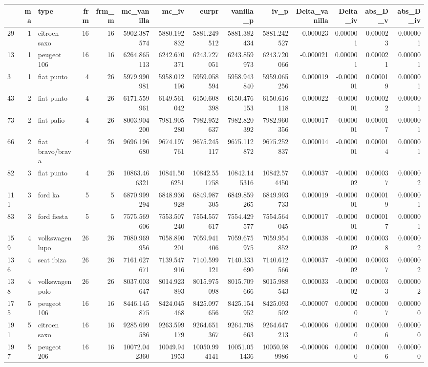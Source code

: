 \begin{tabular}{lrlrrrrrrrrrrr}
\toprule
 & ma & type & frm & frm_m & mc_vanilla & mc_iv & eurpr & vanilla_p & iv_p & Delta_vanilla & Delta_iv & abs_D_v & abs_D_iv \\
\midrule
29 & 1 & citroen saxo & 16 & 16 & 5902.387574 & 5880.192832 & 5881.249512 & 5881.382434 & 5881.242527 & -0.000023 & 0.000001 & 0.000023 & 0.000001 \\
13 & 1 & peugeot 106 & 16 & 16 & 6264.865113 & 6242.670371 & 6243.727051 & 6243.859973 & 6243.720066 & -0.000021 & 0.000001 & 0.000021 & 0.000001 \\
3 & 1 & fiat punto & 4 & 26 & 5979.990981 & 5958.012196 & 5959.058594 & 5958.943840 & 5959.065256 & 0.000019 & -0.000001 & 0.000019 & 0.000001 \\
43 & 2 & fiat punto & 4 & 26 & 6171.559961 & 6149.561042 & 6150.608398 & 6150.476153 & 6150.616118 & 0.000022 & -0.000001 & 0.000022 & 0.000001 \\
73 & 2 & fiat palio & 4 & 26 & 8003.904200 & 7981.905280 & 7982.952637 & 7982.820392 & 7982.960356 & 0.000017 & -0.000001 & 0.000017 & 0.000001 \\
66 & 2 & fiat bravo/brava & 4 & 26 & 9696.196680 & 9674.197761 & 9675.245117 & 9675.112872 & 9675.252837 & 0.000014 & -0.000001 & 0.000014 & 0.000001 \\
82 & 3 & fiat punto & 4 & 26 & 10863.466321 & 10841.506251 & 10842.551758 & 10842.145316 & 10842.574450 & 0.000037 & -0.000002 & 0.000037 & 0.000002 \\
111 & 3 & ford ka & 5 & 5 & 6870.999294 & 6848.936928 & 6849.987305 & 6849.859265 & 6849.993733 & 0.000019 & -0.000001 & 0.000019 & 0.000001 \\
83 & 3 & ford fiesta & 5 & 5 & 7575.569606 & 7553.507240 & 7554.557617 & 7554.429577 & 7554.564045 & 0.000017 & -0.000001 & 0.000017 & 0.000001 \\
159 & 4 & volkswagen lupo & 26 & 26 & 7080.969956 & 7058.890201 & 7059.941406 & 7059.675975 & 7059.954852 & 0.000038 & -0.000002 & 0.000038 & 0.000002 \\
136 & 4 & seat ibiza & 26 & 26 & 7161.627671 & 7139.547916 & 7140.599121 & 7140.333690 & 7140.612566 & 0.000037 & -0.000002 & 0.000037 & 0.000002 \\
138 & 4 & volkswagen polo & 26 & 26 & 8037.003647 & 8014.923893 & 8015.975098 & 8015.709666 & 8015.988543 & 0.000033 & -0.000002 & 0.000033 & 0.000002 \\
175 & 5 & peugeot 106 & 16 & 16 & 8446.145875 & 8424.045468 & 8425.097656 & 8425.154952 & 8425.093502 & -0.000007 & 0.000000 & 0.000007 & 0.000000 \\
191 & 5 & citroen saxo & 16 & 16 & 9285.699586 & 9263.599179 & 9264.651367 & 9264.708663 & 9264.647213 & -0.000006 & 0.000000 & 0.000006 & 0.000000 \\
197 & 5 & peugeot 206 & 16 & 16 & 10072.042360 & 10049.941953 & 10050.994141 & 10051.051436 & 10050.989986 & -0.000006 & 0.000000 & 0.000006 & 0.000000 \\
\bottomrule
\end{tabular}
